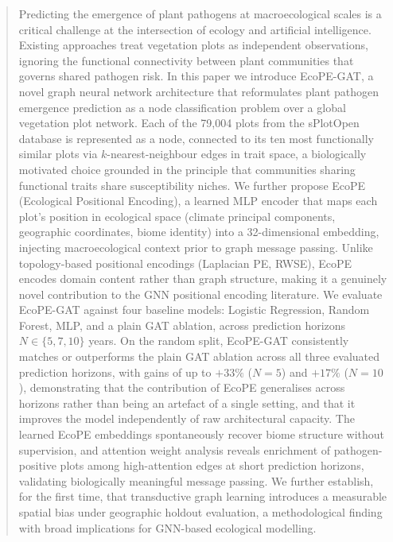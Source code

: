 \documentclass[a4paper,fleqn]{cas-sc}
\begin{document}
\begin{abstract}
Predicting the emergence of plant pathogens at macroecological scales is a critical challenge at the intersection of ecology and artificial intelligence. Existing approaches treat vegetation plots as independent observations, ignoring the functional connectivity between plant communities that governs shared pathogen risk. In this paper we introduce EcoPE-GAT, a novel graph neural network architecture that reformulates plant pathogen emergence prediction as a node classification problem over a global vegetation plot network. Each of the 79{,}004 plots from the sPlotOpen database is represented as a node, connected to its ten most functionally similar plots via $k$-nearest-neighbour edges in trait space, a biologically motivated choice grounded in the principle that communities sharing functional traits share susceptibility niches. We further propose EcoPE (Ecological Positional Encoding), a learned MLP encoder that maps each plot's position in ecological space (climate principal components, geographic coordinates, biome identity) into a 32-dimensional embedding, injecting macroecological context prior to graph message passing. Unlike topology-based positional encodings (Laplacian PE, RWSE), EcoPE encodes domain content rather than graph structure, making it a genuinely novel contribution to the GNN positional encoding literature. We evaluate EcoPE-GAT against four baseline models: Logistic Regression, Random Forest, MLP, and a plain GAT ablation, across prediction horizons $N \in \{5, 7, 10\}$ years. On the random split, EcoPE-GAT consistently matches or outperforms the plain GAT ablation across all three evaluated prediction horizons, with gains of up to $+33\%$ ($N=5$) and $+17\%$ ($N=10$), demonstrating that the contribution of EcoPE generalises across horizons rather than being an artefact of a single setting, and that it improves the model independently of raw architectural capacity. The learned EcoPE embeddings spontaneously recover biome structure without supervision, and attention weight analysis reveals enrichment of pathogen-positive plots among high-attention edges at short prediction horizons, validating biologically meaningful message passing. We further establish, for the first time, that transductive graph learning introduces a measurable spatial bias under geographic holdout evaluation, a methodological finding with broad implications for GNN-based ecological modelling.
\end{abstract}
\end{document}
